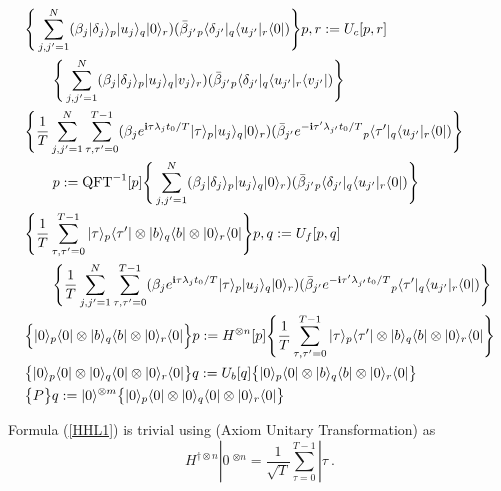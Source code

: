 \begin{align}
&\Bigg\{ \sum_{j,j^\prime = 1}^N (\beta_j|\delta_j\rangle_p|u_j\rangle_q|0\rangle_r)(\bar{\beta}_{j^\prime}{}_p\langle\delta_{j^\prime}|_q\langle u_{j^\prime}|_r\langle0|)   \Bigg\}
p,r := U_c[p,r] \notag\\
&\quad\quad \Bigg\{ \sum_{j,j^\prime = 1}^N (\beta_j|\delta_j\rangle_p|u_j\rangle_q|v_j\rangle_r)(\bar{\beta}_{j^\prime}{}_p\langle\delta_{j^\prime}|_q\langle u_{j^\prime}|_r\langle v_{j^\prime}|)   \Bigg\}\label{HHL4}
\\
&\Bigg\{\frac{1}{T}\sum_{j,j^\prime = 1}^N\sum_{\tau,\tau^\prime = 0}^{T-1}(\beta_je^{\mathbf{i} \tau\lambda_jt_0/T}|\tau\rangle_p|u_j\rangle_q|0\rangle_r)
(\bar{\beta}_{j^\prime}e^{-\mathbf{i} \tau^\prime\lambda_{j^\prime}t_0/T}{}_p\langle\tau^\prime|_q\langle u_{j^\prime}|_r\langle0|) \Bigg\} \notag\\
&\quad\quad p := {\rm QFT}^{-1}[p]\Bigg\{ \sum_{j,j^\prime = 1}^N (\beta_j|\delta_j\rangle_p|u_j\rangle_q|0\rangle_r)(\bar{\beta}_{j^\prime}{}_p\langle\delta_{j^\prime}|_q\langle u_{j^\prime}|_r\langle0|)   \Bigg\} \label{HHL5}
\\
&\Bigg\{\frac{1}{T}\sum_{\tau,\tau^\prime = 0}^{T-1}|\tau\rangle_p\langle\tau^\prime|\otimes|b\rangle_q\langle b|\otimes |0\rangle_r\langle0|\Bigg\}
p,q := U_f[p,q] \notag\\
&\quad\quad\Bigg\{\frac{1}{T}\sum_{j,j^\prime = 1}^N\sum_{\tau,\tau^\prime = 0}^{T-1}(\beta_je^{\mathbf{i} \tau\lambda_jt_0/T}|\tau\rangle_p|u_j\rangle_q|0\rangle_r)
(\bar{\beta}_{j^\prime}e^{-\mathbf{i} \tau^\prime\lambda_{j^\prime}t_0/T}{}_p\langle\tau^\prime|_q\langle u_{j^\prime}|_r\langle0|) \Bigg\} \label{HHL6}
\\
&\Big\{|0\rangle_p\langle0|\otimes |b\rangle_q\langle b|\otimes |0\rangle_r\langle0|\Big\}p := H^{\otimes n}[p]\Bigg\{\frac{1}{T}\sum_{\tau,\tau^\prime = 0}^{T-1}|\tau\rangle_p\langle\tau^\prime|\otimes|b\rangle_q\langle b|\otimes |0\rangle_r\langle0|\Bigg\} \label{HHL7}\\
&\big\{|0\rangle_p\langle0|\otimes |0\rangle_q\langle0|\otimes |0\rangle_r\langle0|\big\}q := U_b[q]\big\{|0\rangle_p\langle0|\otimes |b\rangle_q\langle b|\otimes |0\rangle_r\langle0|\big\} \label{HHL8}\\
&\big\{P\big\}q := |0\rangle^{\otimes m}\big\{|0\rangle_p\langle0|\otimes |0\rangle_q\langle0|\otimes |0\rangle_r\langle0|\big\} \label{HHL9}
\end{align}



Formula (\ref{HHL1}) is trivial using (Axiom Unitary Transformation) as
$$H^{\dag\otimes n}|0\>^{\otimes n} = \frac{1}{\sqrt{T}}\sum_{\tau = 0}^{T-1}|\tau\>.$$

